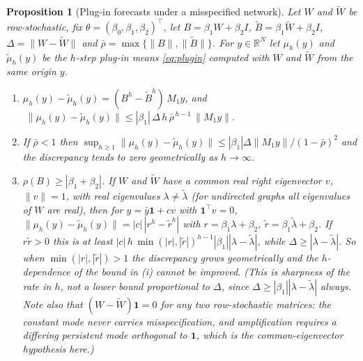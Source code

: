 \documentclass[12pt]{article}
\theoremstyle{plain}
\newtheorem{proposition}{Proposition}
\theoremstyle{definition}
\theoremstyle{remark}
\newcommand{\R}{\mathbb{R}}
\newcommand{\one}{\mathbf{1}}
\newcommand{\T}{^{\top}}
\begin{document}
\begin{proposition}[Plug-in forecasts under a misspecified network]\label{prop:plugin}
Let $W$ and $\widetilde W$ be row-stochastic, fix $\theta=(\beta_0,\beta_1,\beta_2)\T$, let $B=\beta_1W+\beta_2I$, $\widetilde B=\beta_1\widetilde W+\beta_2I$, $\Delta=\|W-\widetilde W\|$ and $\bar\rho=\max\{\|B\|,\|\widetilde B\|\}$. For $y\in\R^N$ let $\mu_h(y)$ and $\tilde\mu_h(y)$ be the $h$-step plug-in means \eqref{eq:plugin} computed with $W$ and $\widetilde W$ from the same origin $y$.
\begin{enumerate}[label=(\roman*),leftmargin=*]
\item $\mu_h(y)-\tilde\mu_h(y)=(B^h-\widetilde B^h)\,M_1y$, and
$\;\|\mu_h(y)-\tilde\mu_h(y)\|\le|\beta_1|\,\Delta\,h\,\bar\rho^{\,h-1}\,\|M_1y\|$.
\item If $\bar\rho<1$ then $\sup_{h\ge1}\|\mu_h(y)-\tilde\mu_h(y)\|\le|\beta_1|\Delta\|M_1y\|/(1-\bar\rho)^2$ and the discrepancy tends to zero geometrically as $h\to\infty$.
\item $\rho(B)\ge|\beta_1+\beta_2|$. If $W$ and $\widetilde W$ have a common real right eigenvector $v$, $\|v\|=1$, with real eigenvalues $\lambda\ne\tilde\lambda$ \textup{(}for undirected graphs all eigenvalues of $W$ are real\textup{)}, then for $y=\bar y\one+cv$ with $\one\T v=0$, $\|\mu_h(y)-\tilde\mu_h(y)\|=|c|\,|r^h-\tilde r^h|$ with $r=\beta_1\lambda+\beta_2$, $\tilde r=\beta_1\tilde\lambda+\beta_2$. If $r\tilde r>0$ this is at least $|c|\,h\,\min(|r|,|\tilde r|)^{h-1}|\beta_1||\lambda-\tilde\lambda|$, while $\Delta\ge|\lambda-\tilde\lambda|$. So when $\min(|r|,|\tilde r|)>1$ the discrepancy grows geometrically and the $h$-dependence of the bound in (i) cannot be improved. (This is sharpness of the \emph{rate} in $h$, not a lower bound proportional to $\Delta$, since $\Delta\ge|\beta_1||\lambda-\tilde\lambda|$ always. Note also that $(W-\widetilde W)\one=0$ for any two row-stochastic matrices: the constant mode never carries misspecification, and amplification requires a differing persistent mode orthogonal to $\one$, which is the common-eigenvector hypothesis here.)
\end{enumerate}
\end{proposition}
\end{document}
